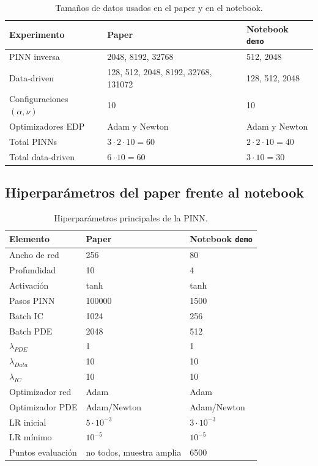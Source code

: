 \documentclass[10pt,letterpaper,twocolumn]{article}
\begin{document}
\begin{table}[H]
\centering
\caption{Tamaños de datos usados en el paper y en el notebook.}
\begin{tabularx}{\columnwidth}{lXX}
\toprule
Experimento & Paper & Notebook \texttt{demo} \\
\midrule
PINN inversa & 2048, 8192, 32768 & 512, 2048 \\
Data-driven & 128, 512, 2048, 8192, 32768, 131072 & 128, 512, 2048 \\
Configuraciones $(\alpha,\nu)$ & 10 & 10 \\
Optimizadores EDP & Adam y Newton & Adam y Newton \\
Total PINNs & $3\cdot2\cdot10=60$ & $2\cdot2\cdot10=40$ \\
Total data-driven & $6\cdot10=60$ & $3\cdot10=30$ \\
\bottomrule
\end{tabularx}
\end{table}

\subsection{Hiperparámetros del paper frente al notebook}

\begin{table}[H]
\centering
\caption{Hiperparámetros principales de la PINN.}
\begin{tabularx}{\columnwidth}{lXX}
\toprule
Elemento & Paper & Notebook \texttt{demo} \\
\midrule
Ancho de red & 256 & 80 \\
Profundidad & 10 & 4 \\
Activación & tanh & tanh \\
Pasos PINN & 100000 & 1500 \\
Batch IC & 1024 & 256 \\
Batch PDE & 2048 & 512 \\
$\lambda_{PDE}$ & 1 & 1 \\
$\lambda_{Data}$ & 10 & 10 \\
$\lambda_{IC}$ & 10 & 10 \\
Optimizador red & Adam & Adam \\
Optimizador PDE & Adam/Newton & Adam/Newton \\
LR inicial & $5\cdot10^{-3}$ & $3\cdot10^{-3}$ \\
LR mínimo & $10^{-5}$ & $10^{-5}$ \\
Puntos evaluación & no todos, muestra amplia & 6500 \\
\bottomrule
\end{tabularx}
\end{table}
\end{document}
